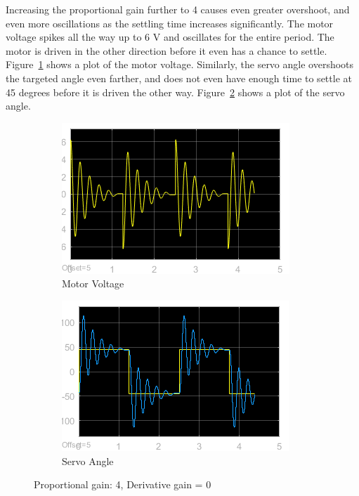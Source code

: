 \documentclass[12pt]{article}
\begin{document}
Increasing the proportional gain further to 4 causes even greater overshoot, and even more oscillations as the settling time increases significantly. The motor voltage spikes all the way up to 6 V and oscillates for the entire period. The motor is driven in the other direction before it even has a chance to settle. Figure~\ref{fig:x_volt} shows a plot of the motor voltage. Similarly, the servo angle overshoots the targeted angle even farther, and does not even have enough time to settle at 45 degrees before it is driven the other way. Figure~\ref{fig:x_angle} shows a plot of the servo angle.
\begin{figure}[h!]
    \centering
    \begin{subfigure}[b]{0.46\textwidth}
        \includegraphics[width=\textwidth]{x_voltage}
        \caption{\label{fig:x_volt}Motor Voltage}
    \end{subfigure}
    \begin{subfigure}[b]{0.46\textwidth}
        \includegraphics[width=\textwidth]{x_angle}
        \caption{\label{fig:x_angle}Servo Angle}
    \end{subfigure}
    \caption{\label{fig:x} Proportional gain: 4, Derivative gain = 0}
\end{figure}
\end{document}
